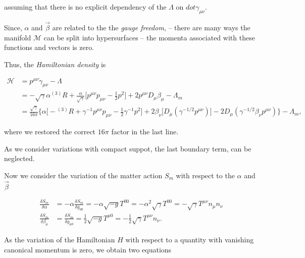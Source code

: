 assuming that there is no explicit dependency of the $\Lambda$ on $dot{\gamma}_{\mu\nu}$.

Since, $\alpha$ and $\vec{\beta}$ are related to the the \textit{gauge freedom}, -- there are many ways the manifold $\mathcal{M}$ can be split into hypersurfaces -- the momenta associated with these functions and vectors is zero.

Thus, the \textit{Hamiltonian density} is

\begin{align}
\mathcal{H} &= p^{\mu\nu}\dot{\gamma}_{\mu\nu} - \Lambda \\
&= -\sqrt{\gamma}\alpha{^{(3)}R} + \frac{\alpha}{\sqrt{\gamma}}\Big[p^{\mu\nu}p_{\mu\nu}-\frac{1}{2}p^2\Big] + 2p^{\mu\nu} D_{\mu}\beta_{\mu} -\Lambda_m \\
&= \frac{\sqrt{\gamma}}{16\pi}\Bigg\{\alpha\Big[ -{^{(3)}R} + \gamma^{-1}p^{\mu\nu}p_{\mu\nu}-\frac{1}{2}\gamma^{-1}p^2\Big] +  2\beta_{\nu}\Big[D_{\mu}(\gamma^{-1/2}p^{\mu\nu})\Big] - 2D_{\mu}(\gamma^{-1/2}\beta_{\nu}p^{\mu\nu}) \Bigg\} - \Lambda_m,
\end{align}

where we restored the correct $16\pi$ factor in the last line.

As we consider variations with compact suppot, the last boundary term, can be neglected.


Now we consider the variation of the matter action $S_m$ with respect to the $\alpha$ and $\vec{\beta}$

\begin{align}
\frac{\delta S_m}{\delta \alpha} &=-\alpha\frac{\delta S_m}{\delta g_{00}} = -\alpha\sqrt{-g}T^{00} = -\alpha^2\sqrt{\gamma}T^{00} = -\sqrt{\gamma}T^{\mu\nu}n_{\mu}n_{\nu} \\
\frac{\delta S_m}{\delta \beta_{\mu}} &= \frac{\delta S_m}{\delta g_{\mu 0}} =\frac{1}{2}\sqrt{-g}T^{\mu 0} = -\frac{1}{2} \sqrt{\gamma}T^{\mu\nu}n_{\nu}.
\end{align}

As the variation of the Hamiltonian $H$ with respect to a quantity with vanishing canonical momentum is zero, we obtain two equations 

